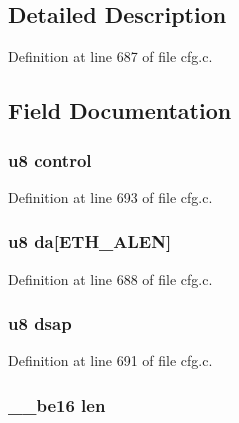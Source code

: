 \subsection{Detailed Description}


Definition at line 687 of file cfg.\-c.



\subsection{Field Documentation}
\hypertarget{structiapp__layer2__update_aa8da087d38de0d260639bbec5c30e1bc}{
\subsubsection[{control}]{\setlength{\rightskip}{0pt plus 5cm}u8 control}}\label{structiapp__layer2__update_aa8da087d38de0d260639bbec5c30e1bc}


Definition at line 693 of file cfg.\-c.

\hypertarget{structiapp__layer2__update_ab5293261358b59532e274da4e90cd5d9}{
\subsubsection[{da}]{\setlength{\rightskip}{0pt plus 5cm}u8 da\mbox{[}E\-T\-H\-\_\-\-A\-L\-E\-N\mbox{]}}}\label{structiapp__layer2__update_ab5293261358b59532e274da4e90cd5d9}


Definition at line 688 of file cfg.\-c.

\hypertarget{structiapp__layer2__update_a41da1e30acc545368f8fd4486b8ddde0}{
\subsubsection[{dsap}]{\setlength{\rightskip}{0pt plus 5cm}u8 dsap}}\label{structiapp__layer2__update_a41da1e30acc545368f8fd4486b8ddde0}


Definition at line 691 of file cfg.\-c.

\hypertarget{structiapp__layer2__update_a52677ab565a13bf20b2a616ead6934d7}{
\subsubsection[{len}]{\setlength{\rightskip}{0pt plus 5cm}\-\_\-\-\_\-be16 len}}\label{structiapp__layer2__update_a52677ab565a13bf20b2a616ead6934d7}


